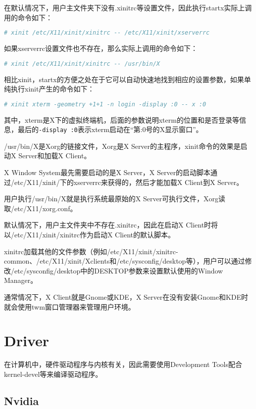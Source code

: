在默认情况下，用户主文件夹下没有.xinitrc等设置文件，因此执行startx实际上调用的命令如下：


\begin{lstlisting}[language=bash]
# xinit /etc/X11/xinit/xinitrc -- /etc/X11/xinit/xserverrc
\end{lstlisting}

如果xserverrc设置文件也不存在，那么实际上调用的命令如下：

\begin{lstlisting}[language=bash]
# xinit /etc/X11/xinit/xinitrc -- /usr/bin/X
\end{lstlisting}

相比xinit，startx的方便之处在于它可以自动快速地找到相应的设置参数，如果单纯执行xinit产生的命令如下：

\begin{lstlisting}[language=bash]
# xinit xterm -geometry +1+1 -n login -display :0 -- x :0
\end{lstlisting}
其中，xterm是X下的虚拟终端机，后面的参数说明xterm的位置和是否登录等信息，最后的\texttt{-display~:0}表示xterm启动在“第:0号的X显示窗口”。

/usr/bin/X是Xorg的链接文件，Xorg是X Server的主程序，xinit命令的效果是启动X Server和加载X Client。


X Window System最先需要启动的是X Server，X Server的启动脚本通过/etc/X11/xinit/下的xserverrc来获得的，然后才能加载X Client到X Server。

用户执行/usr/bin/X就是执行系统最原始的X Server可执行文件，Xorg读取/etc/X11/xorg.conf。

默认情况下，用户主文件夹中不存在.xinitrc，因此在启动X Client时将以/etc/X11/xinit/xinitrc作为启动X Client的默认脚本。

xinitrc加载其他的文件参数（例如/etc/X11/xinit/xinitrc-common、/etc/X11/xinit/Xclients和/etc/sysconfig/desktop等），用户可以通过修改/etc/sysconfig/desktop中的DESKTOP参数来设置默认使用的Window Manager。

通常情况下，X Client就是Gnome或KDE，X Server在没有安装Gnome和KDE时就会使用twm窗口管理器来管理用户环境。



\chapter{Driver}

在计算机中，硬件驱动程序与内核有关，因此需要使用Development Tools配合kernel-devel等来编译驱动程序。

\section{Nvidia}


